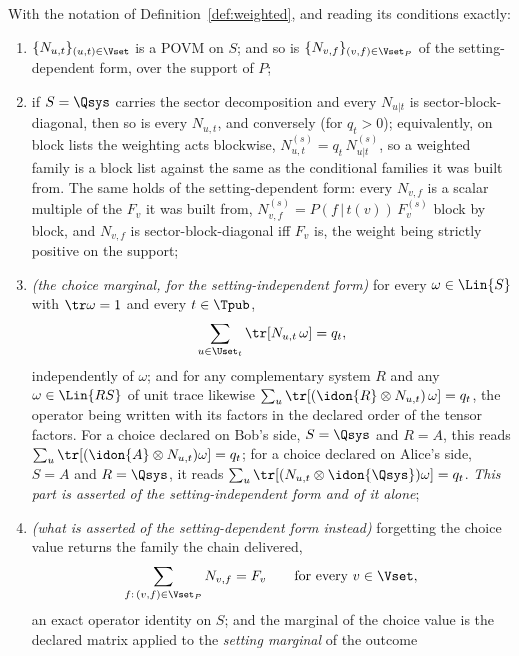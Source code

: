 \begin{lemma}\label{lem:weighted}
With the notation of Definition~\ref{def:weighted}, and reading its conditions
exactly:
\begin{enumerate}[label=(\roman*),leftmargin=2.2em]
\item $\{N_{u,t}\}_{(u,t)\in\Vset}$ is a POVM on $S$; and so is
$\{N_{v,f}\}_{(v,f)\in\Vset_P}$ of the setting-dependent form, over the
support of $P$;
\item if $S=\Qsys$ carries the sector decomposition and every $N_{u|t}$ is
sector-block-diagonal, then so is every $N_{u,t}$, and conversely (for
$q_t>0$); equivalently, on block lists the weighting acts blockwise,
$N_{u,t}^{(s)}=q_t\,N_{u|t}^{(s)}$, so a weighted family is a block list
against the same  as the conditional families it was built from.
The same holds of the setting-dependent form: every $N_{v,f}$ is a scalar
multiple of the $F_v$ it was built from, $N_{v,f}^{(s)}=P(f\,|\,t(v))\,F_v^{(s)}$
block by block, and $N_{v,f}$ is sector-block-diagonal iff $F_v$ is, the
weight being strictly positive on the support;
\item \emph{(the choice marginal, for the setting-independent form)} for every
$\omega\in\Lin{S}$ with $\tr\omega=1$ and every $t\in\Tpub$,
\begin{equation}\label{eq:choicemass}
  \sum_{u\in\Uset_t}\tr[N_{u,t}\,\omega]=q_t ,
\end{equation}
independently of $\omega$; and for any complementary system $R$ and any
$\omega\in\Lin{RS}$ of unit trace likewise
$\sum_{u}\tr[(\idon{R}\otimes N_{u,t})\,\omega]=q_t$, the operator being
written with its factors in the declared order of the tensor factors. For a
choice declared on Bob's side, $S=\Qsys$ and $R=A$, this reads
$\sum_u\tr[(\idon{A}\otimes N_{u,t})\omega]=q_t$; for a choice declared on
Alice's side, $S=A$ and $R=\Qsys$, it reads
$\sum_u\tr[(N_{u,t}\otimes\idon{\Qsys})\omega]=q_t$. \emph{This part is
asserted of the setting-independent form and of it alone};
\item \emph{(what is asserted of the setting-dependent form instead)}
forgetting the choice value returns the family the chain delivered,
\begin{equation}\label{eq:forgetf}
  \sum_{f:\,(v,f)\in\Vset_P}N_{v,f}=F_v\qquad\text{for every }v\in\Vset ,
\end{equation}
an exact operator identity on $S$; and the marginal of the choice value is
the declared matrix applied to the \emph{setting marginal} of the outcome

\end{enumerate}
\end{lemma}
